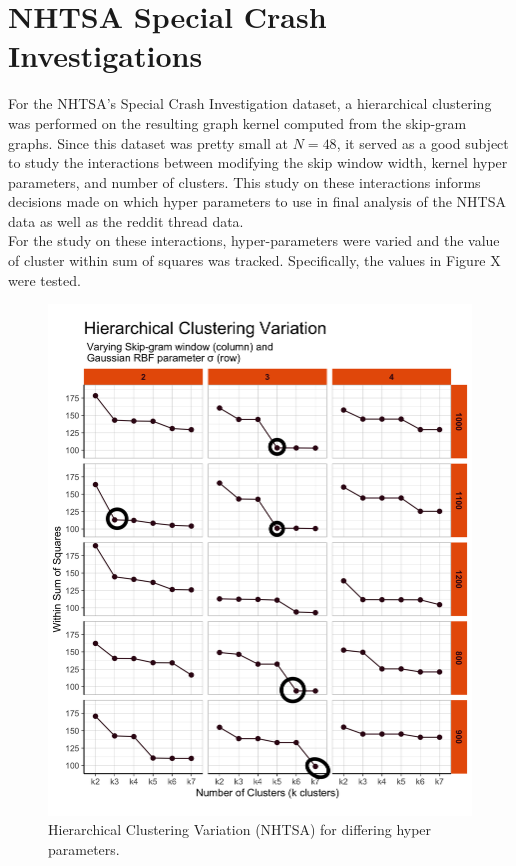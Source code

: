 %
%
%




\section{NHTSA Special Crash Investigations}
 For the NHTSA's Special Crash Investigation dataset, a hierarchical clustering was performed on the resulting graph kernel computed from the skip-gram graphs. Since this dataset was pretty small at $N=48$, it served as a good subject to study the interactions between modifying the skip window width, kernel hyper parameters, and number of clusters. This study on these interactions informs decisions made on which hyper parameters to use in final analysis of the NHTSA data as well as the reddit thread data. \\
 
For the study on these interactions, hyper-parameters were varied and the value of cluster within sum of squares was tracked. Specifically, the values in Figure X were tested. \\
 

\begin{figure}
\includegraphics[width=6in]{Content/Images/hclust_variation.png}
\caption{Hierarchical Clustering Variation (NHTSA) for differing hyper parameters.}
\end{figure}

